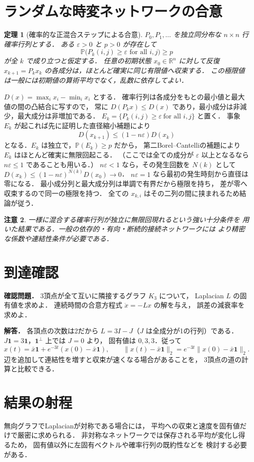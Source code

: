 \documentclass[a5paper,10pt,onecolumn]{jsarticle}
\makeatletter
\theoremstyle{mathnotetheorem}
\newtheorem{theorem}{定理}[section]
\newtheorem{remark}[theorem]{注意}
\renewcommand{\proofname}{証明}
\renewenvironment{proof}[1][\proofname]{%
  \par\pushQED{\qed}\normalfont\topsep4\p@\@plus2\p@\relax
  \trivlist\item[\hskip\labelsep\bfseries #1]\ignorespaces
}{\popQED\endtrivlist\@endpefalse}
\makeatother
\begin{document}
\section{ランダムな時変ネットワークの合意}
\begin{theorem}[確率的な正混合ステップによる合意]
$P_0,P_1,\ldots$ を独立同分布な $n\times n$ 行確率行列とする．
ある $\varepsilon>0$ と $p>0$ が存在して
\[
 \mathbb P\bigl(P_k(i,j)\ge\varepsilon
 \text{ for all }i,j\bigr)\ge p
\]
が全 $k$ で成り立つと仮定する．
任意の初期状態 $x_0\in\mathbb R^n$ に対して反復
$x_{k+1}=P_kx_k$ の各成分は，ほとんど確実に同じ有限値へ収束する．
この極限値は一般には初期値の算術平均でなく，乱数に依存してよい．
\end{theorem}
\begin{proof}
$D(x)=\max_i x_i-\min_i x_i$ とする．
確率行列は各成分をもとの最小値と最大値の間の凸結合に写すので，
常に $D(P_kx)\le D(x)$ であり，最小成分は非減少，最大成分は非増加である．
$E_k=\{P_k(i,j)\ge\varepsilon\ \text{for all }i,j\}$ と置く．
事象 $E_k$ が起これば先に証明した直径縮小補題により
\[
 D(x_{k+1})\le(1-n\varepsilon)D(x_k)
\]
となる．$E_k$ は独立で，$\mathbb P(E_k)\ge p$ だから，
第二Borel--Cantelliの補題により $E_k$ はほとんど確実に無限回起こる．
（ここでは全ての成分が $\varepsilon$ 以上となるなら
$n\varepsilon\le1$ であることも用いる．）
$n\varepsilon<1$ なら，その発生回数を $N(k)$ として
$D(x_k)\le(1-n\varepsilon)^{N(k)}D(x_0)\to0$．
$n\varepsilon=1$ なら最初の発生時刻から直径は零になる．
最小成分列と最大成分列は単調で有界だから極限を持ち，
差が零へ収束するので同一の極限を持つ．
全ての $x_{k,i}$ はその二列の間に挟まれるため結論が従う．
\end{proof}
\begin{remark}
一様に混合する確率行列が独立に無限回現れるという強い十分条件を
用いた結果である．一般の依存的・有向・断続的接続ネットワークには
より精密な係数や連結性条件が必要である．
\end{remark}


\section*{到達確認}
\noindent\textbf{確認問題．}
3頂点が全て互いに隣接するグラフ $K_3$ について，
Laplacian $L$ の固有値を求めよ．
連続時間の合意方程式 $\dot x=-Lx$ の解を与え，
誤差の減衰率を求めよ．

\medskip\noindent\textbf{解答．}
各頂点の次数は2だから
$L=3I-J$（$J$ は全成分が1の行列）である．
$J\mathbf1=3\mathbf1$，$\mathbf1^\perp$ 上では $J=0$ より，
固有値は $0,3,3$．従って
\[
 x(t)=\bar x\mathbf1+e^{-3t}(x(0)-\bar x\mathbf1),
 \qquad
 \|x(t)-\bar x\mathbf1\|_2
 =e^{-3t}\|x(0)-\bar x\mathbf1\|_2.
\]
辺を追加して連結性を増すと収束が速くなる場合があることを，
3頂点の道の計算と比較できる．

\section*{結果の射程}
\noindent 無向グラフでLaplacianが対称である場合には，
平均への収束と速度を固有値だけで厳密に求められる．
非対称なネットワークでは保存される平均が変化し得るため，
固有値以外に左固有ベクトルや確率行列の既約性などを
検討する必要がある．
\end{document}
